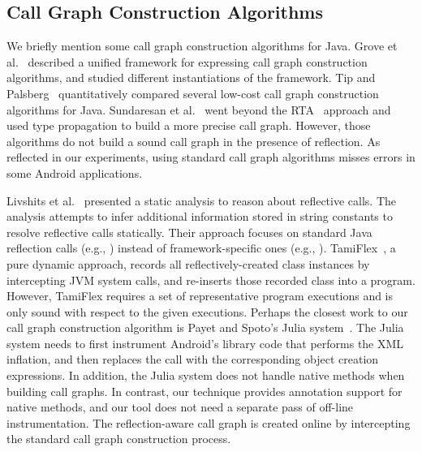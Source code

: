 


\tinystep

\subsection{Call Graph Construction Algorithms}

We briefly mention some call graph construction
algorithms for Java. Grove et al.~\cite{kcfa} described a unified
framework for expressing call graph construction algorithms, and
studied different instantiations of the framework.
Tip and Palsberg~\cite{xta} quantitatively compared
several low-cost call graph construction algorithms for Java.
Sundaresan et al.~\cite{Sundaresan:2000} went beyond the
RTA~\cite{rta} approach and used type propagation
to build a more precise call graph.  However,
those algorithms do not build a sound call graph in the presence of reflection.
As reflected in our experiments, using standard call graph algorithms
misses errors in some Android applications.


Livshits et al.~\cite{Livshits:2005} presented a static analysis
to reason about reflective calls. The analysis
attempts to infer additional information stored in string constants to resolve
reflective calls statically. Their approach focuses on standard Java
reflection calls (e.g., ) instead of
framework-specific ones (e.g., ).
TamiFlex~\cite{Bodden:2011}, a pure dynamic
approach, records all reflectively-created class instances
by intercepting JVM system calls, and re-inserts those recorded 
class into a program. However, TamiFlex requires a set of representative
program executions and is only sound with respect to the given executions.
Perhaps the closest work to our call graph
construction algorithm is Payet and Spoto's Julia
system~\cite{Payet:2011:SAA:2032266.2032299}. The Julia system
needs to first instrument Android's library code that performs the XML inflation,
and then replaces the  call with the corresponding
object creation expressions. In addition, the Julia system does not handle
native methods when building call graphs. In contrast, our technique provides
annotation support for native methods, and our tool does not need a separate
pass of off-line instrumentation. The reflection-aware call graph is created
online by intercepting the standard call graph construction process.

